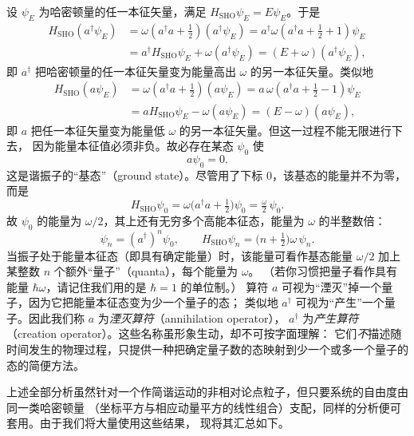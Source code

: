 设 $\psi_{E}$ 为哈密顿量的任一本征矢量，满足 $H_{\text{SHO}}\psi_{E}=E\psi_{E}$。于是
\begin{align*}
H_{\text{SHO}}(a^{\dagger}\psi_{E})
&=\omega(a^{\dagger}a+\tfrac12)(a^{\dagger}\psi_{E})
=a^{\dagger}\omega(a^{\dagger}a+\tfrac12+1)\psi_{E}\\
&=a^{\dagger}H_{\text{SHO}}\psi_{E}+\omega(a^{\dagger}\psi_{E})
=(E+\omega)(a^{\dagger}\psi_{E}),
\end{align*}
即 $a^{\dagger}$ 把哈密顿量的任一本征矢量变为能量高出 $\omega$ 的另一本征矢量。类似地
\begin{align*}
H_{\text{SHO}}(a\psi_{E})
&=\omega(a^{\dagger}a+\tfrac12)(a\psi_{E})
=a\,\omega(a^{\dagger}a+\tfrac12-1)\psi_{E}\\
&=aH_{\text{SHO}}\psi_{E}-\omega(a\psi_{E})
=(E-\omega)(a\psi_{E}),
\end{align*}
即 $a$ 把任一本征矢量变为能量低 $\omega$ 的另一本征矢量。但这一过程不能无限进行下去，
因为能量本征值必须非负。故必存在某态 $\psi_{0}$ 使
\begin{equation*}
a\psi_{0}=0 .
\end{equation*}
这是谐振子的“基态”（ground state）。尽管用了下标 $0$，该基态的能量并不为零，而是
\begin{equation*}
H_{\text{SHO}}\psi_{0}=\omega\bigl(a^{\dagger}a+\tfrac12\bigr)\psi_{0}=\tfrac{\omega}{2}\,\psi_{0}.
\end{equation*}
故 $\psi_{0}$ 的能量为 $\omega/2$，其上还有无穷多个高能本征态，能量为 $\omega$ 的半整数倍：
\begin{equation*}
\psi_{n}=(a^{\dagger})^{n}\psi_{0},\qquad
H_{\text{SHO}}\psi_{n}=\bigl(n+\tfrac12\bigr)\omega\,\psi_{n}.
\end{equation*}
当振子处于能量本征态（即具有确定能量）时，该能量可看作基态能量 $\omega/2$
加上某整数 $n$ 个额外“量子”（quanta），每个能量为 $\omega$。
（若你习惯把量子看作具有能量 $\hbar\omega$，请记住我们用的是 $\hbar=1$ 的单位制。）
算符 $a$ 可视为“湮灭”掉一个量子，因为它把能量本征态变为少一个量子的态；
类似地 $a^{\dagger}$ 可视为“产生”一个量子。因此我们称 $a$ 为\emph{湮灭算符}（annihilation operator），
$a^{\dagger}$ 为\emph{产生算符}（creation operator）。这些名称虽形象生动，却不可按字面理解：
它们\emph{不}描述随时间发生的物理过程，只提供一种把确定量子数的态映射到少一个或多一个量子的态的简便方法。

上述全部分析虽然针对一个作简谐运动的非相对论点粒子，但只要系统的自由度由同一类哈密顿量
（坐标平方与相应动量平方的线性组合）支配，同样的分析便可套用。由于我们将大量使用这些结果，
现将其汇总如下。

